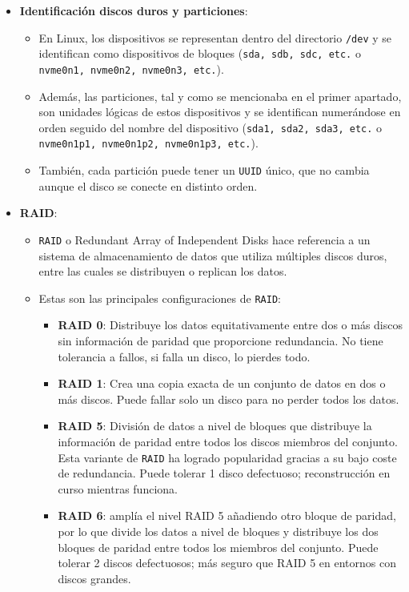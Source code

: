 \documentclass[10pt]{article}
\begin{document}
\begin{itemize}
\begin{itemize}
		\end{itemize}
		\item \textbf{Identificación discos duros y particiones}:
		\begin{itemize}
			\item En Linux, los dispositivos se representan dentro del directorio \verb|/dev| y se identifican como dispositivos de bloques (\verb|sda, sdb, sdc, etc.| o \verb|nvme0n1, nvme0n2, nvme0n3, etc.|).
			\item Además, las particiones, tal y como se mencionaba en el primer apartado, son unidades lógicas de estos dispositivos y se identifican numerándose en orden seguido del nombre del dispositivo (\verb|sda1, sda2, sda3, etc.| o \verb|nvme0n1p1, nvme0n1p2, nvme0n1p3, etc.|).\cite{Discos}
			\item También, cada partición puede tener un \verb|UUID| único, que no cambia aunque el disco se conecte en distinto orden.
		\end{itemize}
		\item \textbf{RAID}: 
		\begin{itemize}
			\item \verb|RAID| o Redundant Array of Independent Disks hace referencia a un sistema de almacenamiento de datos que utiliza múltiples discos duros, entre las cuales se distribuyen o replican los datos. \cite{RAID}
			\item Estas son las principales configuraciones de \verb|RAID|:
			\begin{itemize}
				\item \textbf{RAID 0}: Distribuye los datos equitativamente entre dos o más discos sin información de paridad que proporcione redundancia. No tiene tolerancia a fallos, si falla un disco, lo pierdes todo.
				\item \textbf{RAID 1}: Crea una copia exacta de un conjunto de datos en dos o más discos. Puede fallar solo un disco para no perder todos los datos.
				\item \textbf{RAID 5}: División de datos a nivel de bloques que distribuye la información de paridad entre todos los discos miembros del conjunto. Esta variante de \verb|RAID| ha logrado popularidad gracias a su bajo coste de redundancia. Puede tolerar 1 disco defectuoso; reconstrucción en curso mientras funciona.
				\item \textbf{RAID 6}: amplía el nivel RAID 5 añadiendo otro bloque de paridad, por lo que divide los datos a nivel de bloques y distribuye los dos bloques de paridad entre todos los miembros del conjunto. Puede tolerar 2 discos defectuosos; más seguro que RAID 5 en entornos con discos grandes.
			\end{itemize}
		\end{itemize}
	\end{itemize}
	
	\clearpage
	
	
\end{document}
